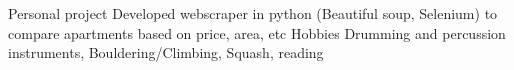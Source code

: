 \documentclass[11pt, a4paper]{awesome-cv}
\begin{document}

\makecvheader[C]



\vspace{-3mm}
 

%



\vspace{5mm}


\begin{cvskills}
    \cvskill
    {Personal project}
    {Developed webscraper in python (Beautiful soup, Selenium) to compare apartments based on price, area, etc}
    \cvskill
    {Hobbies} %
    {Drumming and percussion instruments, Bouldering/Climbing, Squash, reading} %
\end{cvskills}

\end{document}

